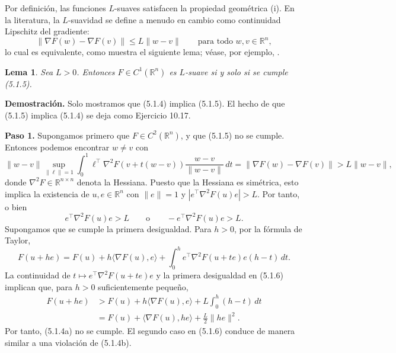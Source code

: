 \documentclass[11pt]{report}
\newenvironment{tcolorbox}[1][]{\par\medskip\noindent\ignorespaces}{\par\medskip}
\theoremstyle{definition}
\theoremstyle{plain}
\newtheorem{lema}[definicion]{Lema}
\numberwithin{equation}{section}
\begin{document}
Por definición, las funciones \(L\)-suaves satisfacen la propiedad geométrica (i). En la literatura, la \(L\)-suavidad se define a menudo en cambio como continuidad Lipschitz del gradiente:
\begin{equation*}
    \|\nabla F(w)-\nabla F(v)\|
    \leq
    L\|w-v\|
    \qquad
    \text{para todo } w,v\in\mathbb{R}^n,
    \tag{5.1.5}
\end{equation*}
lo cual es equivalente, como muestra el siguiente lema; véase, por ejemplo, \cite{beck-2017,nesterov-2018}.

\begin{tcolorbox}[colback=blue!8, colframe=blue!8, boxrule=0pt]
\begin{lema}
Sea \(L>0\). Entonces \(F\in C^1(\mathbb{R}^n)\) es \(L\)-suave si y solo si se cumple (5.1.5).
\end{lema}
\end{tcolorbox}

\textbf{Demostración.} Solo mostramos que (5.1.4) implica (5.1.5). El hecho de que (5.1.5) implica (5.1.4) se deja como Ejercicio 10.17.

\textbf{Paso 1.} Supongamos primero que \(F\in C^2(\mathbb{R}^n)\), y que (5.1.5) no se cumple. Entonces podemos encontrar \(w\neq v\) con
\begin{equation*}
    \|w-v\|
    \sup_{\|\ell\|=1}
    \int_0^1
    \ell^\top
    \nabla^2F(v+t(w-v))
    \frac{w-v}{\|w-v\|}
    \,dt
    =
    \|\nabla F(w)-\nabla F(v)\|
    >
    L\|w-v\|,
\end{equation*}
donde \(\nabla^2F\in\mathbb{R}^{n\times n}\) denota la Hessiana. Puesto que la Hessiana es simétrica, esto implica la existencia de \(u,e\in\mathbb{R}^n\) con \(\|e\|=1\) y \(|e^\top\nabla^2F(u)e|>L\). Por tanto, o bien
\begin{equation*}
    e^\top\nabla^2F(u)e>L
    \qquad
    \text{o}
    \qquad
    -e^\top\nabla^2F(u)e>L.
    \tag{5.1.6}
\end{equation*}
Supongamos que se cumple la primera desigualdad. Para \(h>0\), por la fórmula de Taylor,
\begin{equation*}
    F(u+he)
    =
    F(u)+h\langle\nabla F(u),e\rangle
    +
    \int_0^h
    e^\top\nabla^2F(u+te)e(h-t)\,dt.
\end{equation*}
La continuidad de \(t\mapsto e^\top\nabla^2F(u+te)e\) y la primera desigualdad en (5.1.6) implican que, para \(h>0\) suficientemente pequeño,
\begin{align*}
    F(u+he)
    &>
    F(u)+h\langle\nabla F(u),e\rangle
    +
    L\int_0^h(h-t)\,dt\\
    &=
    F(u)+\langle\nabla F(u),he\rangle
    +
    \frac{L}{2}\|he\|^2.
\end{align*}
Por tanto, (5.1.4a) no se cumple. El segundo caso en (5.1.6) conduce de manera similar a una violación de (5.1.4b).
\end{document}
